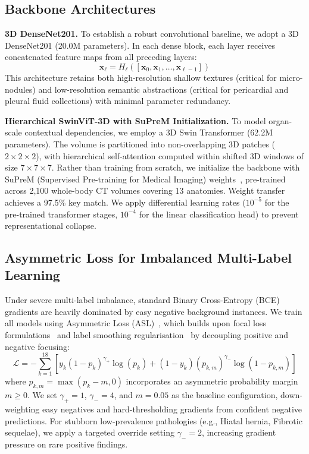 \documentclass[runningheads]{llncs}
\begin{document}
\subsection{Backbone Architectures}
\noindent\textbf{3D DenseNet201.} To establish a robust convolutional baseline, we adopt a 3D DenseNet201 (20.0M parameters). In each dense block, each layer receives concatenated feature maps from all preceding layers:
\begin{equation}
\mathbf{x}_\ell = H_\ell([\mathbf{x}_0, \mathbf{x}_1, \dots, \mathbf{x}_{\ell-1}])
\end{equation}
This architecture retains both high-resolution shallow textures (critical for micro-nodules) and low-resolution semantic abstractions (critical for pericardial and pleural fluid collections) with minimal parameter redundancy.

\noindent\textbf{Hierarchical SwinViT-3D with SuPreM Initialization.} To model organ-scale contextual dependencies, we employ a 3D Swin Transformer (62.2M parameters). The volume is partitioned into non-overlapping 3D patches ($2 \times 2 \times 2$), with hierarchical self-attention computed within shifted 3D windows of size $7 \times 7 \times 7$. Rather than training from scratch, we initialize the backbone with SuPreM (Supervised Pre-training for Medical Imaging) weights~\cite{li2024}, pre-trained across 2,100 whole-body CT volumes covering 13 anatomies. Weight transfer achieves a 97.5\% key match. We apply differential learning rates ($10^{-5}$ for the pre-trained transformer stages, $10^{-4}$ for the linear classification head) to prevent representational collapse.

\subsection{Asymmetric Loss for Imbalanced Multi-Label Learning}
Under severe multi-label imbalance, standard Binary Cross-Entropy (BCE) gradients are heavily dominated by easy negative background instances. We train all models using Asymmetric Loss (ASL)~\cite{ridnik2021}, which builds upon focal loss formulations~\cite{lin2017} and label smoothing regularisation~\cite{szegedy2016} by decoupling positive and negative focusing:
\begin{equation}
\mathcal{L} = -\sum_{k=1}^{18} \left[ y_k (1 - p_k)^{\gamma_+} \log(p_k) + (1 - y_k) (p_{k,m})^{\gamma_-} \log(1 - p_{k,m}) \right]
\end{equation}
where $p_{k,m} = \max(p_k - m, 0)$ incorporates an asymmetric probability margin $m \ge 0$. We set $\gamma_+ = 1$, $\gamma_- = 4$, and $m = 0.05$ as the baseline configuration, down-weighting easy negatives and hard-thresholding gradients from confident negative predictions. For stubborn low-prevalence pathologies (e.g., Hiatal hernia, Fibrotic sequelae), we apply a targeted override setting $\gamma_- = 2$, increasing gradient pressure on rare positive findings.
\end{document}
